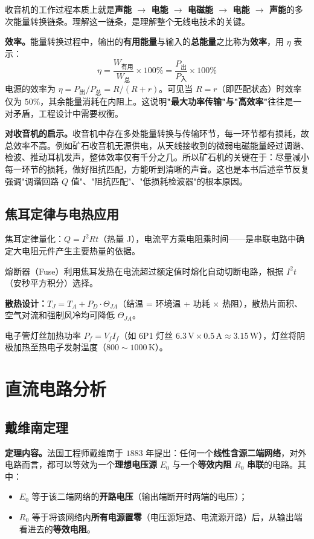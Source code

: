 \documentclass[12pt,UTF8]{ctexbook}
\begin{document}
收音机的工作过程本质上就是\textbf{声能 $\rightarrow$ 电能 $\rightarrow$ 电磁能 $\rightarrow$ 电能 $\rightarrow$ 声能}的多次能量转换链条。理解这一链条，是理解整个无线电技术的关键。

\textbf{效率。}能量转换过程中，输出的\textbf{有用能量}与输入的\textbf{总能量}之比称为\textbf{效率}，用 $\eta$ 表示：
\[
\eta = \frac{W_{\text{有用}}}{W_{\text{总}}} \times 100\% = \frac{P_{\text{出}}}{P_{\text{入}}} \times 100\%
\]
电源的效率为 $\eta = P_{\text{出}}/P_{\text{总}} = R/(R+r)$。可见当 $R=r$（即匹配状态）时效率仅为 $50\%$，其余能量消耗在内阻上。这说明\textbf{"最大功率传输"与"高效率"}往往是一对矛盾，工程设计中需要权衡。

\textbf{对收音机的启示。}收音机中存在多处能量转换与传输环节，每一环节都有损耗，故总效率不高。例如矿石收音机无源供电，从天线接收到的微弱电磁能量经过调谐、检波、推动耳机发声，整体效率仅有千分之几。所以矿石机的关键在于：尽量减小每一环节的损耗，做好阻抗匹配，方能听到清晰的声音。这也是本书后述章节反复强调"调谐回路 $Q$ 值"、"阻抗匹配"、"低损耗检波器"的根本原因。

\subsection{焦耳定律与电热应用}
焦耳定律量化：$Q = I^2 R t$（热量 J），电流平方乘电阻乘时间——是串联电路中确定大电阻元件产生主要热量的依据。

熔断器（Fuse）利用焦耳发热在电流超过额定值时熔化自动切断电路，根据 $I^2t$（安秒平方积分）选择。

\textbf{散热设计：}$T_J = T_A + P_D \cdot \Theta_{JA}$（结温 = 环境温 + 功耗 $\times$ 热阻），散热片面积、空气对流和强制风冷均可降低 $\Theta_{JA}$。

电子管灯丝加热功率 $P_f = V_f I_f$（如 6P1 灯丝 $6.3\,\mathrm{V}\times0.5\,\mathrm{A}\approx3.15\,\mathrm{W}$），灯丝将阴极加热至热电子发射温度（$800\sim1000\,\mathrm{K}$）。

\section{直流电路分析}
\label{sec:dc_circuit_analysis}

\subsection{戴维南定理}

\textbf{定理内容。}法国工程师戴维南于 $1883$ 年提出：任何一个\textbf{线性含源二端网络}，对外电路而言，都可以等效为一个\textbf{理想电压源} $E_0$ 与一个\textbf{等效内阻} $R_0$ \textbf{串联}的电路。其中：
\begin{itemize}
  \item $E_0$ 等于该二端网络的\textbf{开路电压}（输出端断开时两端的电压）；
  \item $R_0$ 等于将该网络内\textbf{所有电源置零}（电压源短路、电流源开路）后，从输出端看进去的\textbf{等效电阻}。
\end{itemize}
\end{document}

